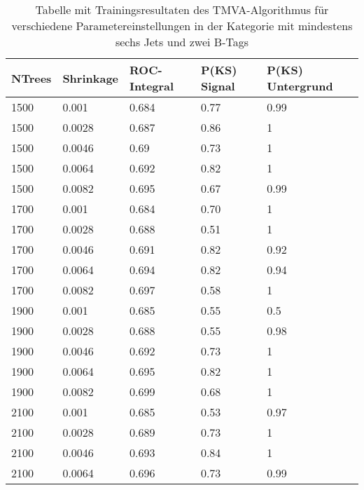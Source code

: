 \begin{table}[tbp]\parbox{12cm}{
\renewcommand\thetable{A.3}
  \caption[TMVA 6j2t Ergebnisse]{Tabelle mit Trainingsresultaten des TMVA-Algorithmus f\"ur verschiedene Parametereinstellungen in der Kategorie mit mindestens sechs Jets und zwei B-Tags}%
  }\label{tab:tmva_6j2t}
  \begin{center}
  \begin{tabular}{lllll}
  \hline
  NTrees & Shrinkage & ROC-Integral & P(KS) Signal & P(KS) Untergrund\\
  \hline
\num{1500} & \num{0.001}  & \num{0,684} & \num{0,77} & \num{0,99}\\
\num{1500} & \num{0.0028} & \num{0,687} & \num{0,86} & \num{1}\\
\num{1500} & \num{0.0046} & \num{0,69}  & \num{0,73} & \num{1}\\
\num{1500} & \num{0.0064} & \num{0,692} & \num{0,82} & \num{1}\\
\num{1500} & \num{0.0082} & \num{0,695} & \num{0,67} & \num{0,99}\\
\num{1700} & \num{0.001}  & \num{0,684} & \num{0,70} & \num{1}\\
\num{1700} & \num{0.0028} & \num{0,688} & \num{0,51} & \num{1}\\
\num{1700} & \num{0.0046} & \num{0,691} & \num{0,82} & \num{0,92}\\
\num{1700} & \num{0.0064} & \num{0,694} & \num{0,82} & \num{0,94}\\
\num{1700} & \num{0.0082} & \num{0,697} & \num{0,58} & \num{1}\\
\num{1900} & \num{0.001}  & \num{0,685} & \num{0,55} & \num{0,5}\\
\num{1900} & \num{0.0028} & \num{0,688} & \num{0,55} & \num{0,98}\\
\num{1900} & \num{0.0046} & \num{0,692} & \num{0,73} & \num{1}\\
\num{1900} & \num{0.0064} & \num{0,695} & \num{0,82} & \num{1}\\
\num{1900} & \num{0.0082} & \num{0,699} & \num{0,68} & \num{1}\\
\num{2100} & \num{0.001}  & \num{0,685} & \num{0,53} & \num{0,97}\\
\num{2100} & \num{0.0028} & \num{0,689} & \num{0,73} & \num{1}\\
\num{2100} & \num{0.0046} & \num{0,693} & \num{0,84} & \num{1}\\
\num{2100} & \num{0.0064} & \num{0,696} & \num{0,73} & \num{0,99}\\

\end{tabular}
\end{center}
\end{table}
